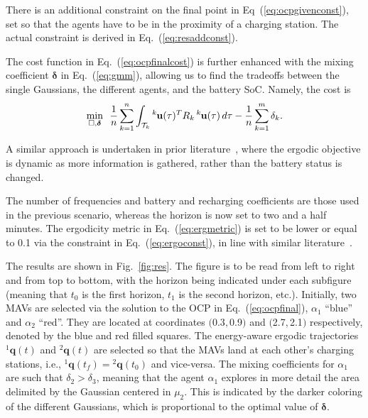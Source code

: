 \documentclass[letterpaper,10pt,conference,twoside]{IEEEtran}
\theoremstyle{definition}
\begin{document}
There is an additional constraint on the final point in Eq~(\ref{eq:ocpgivenconst}), set so that the agents have to be in the proximity of a charging station. The actual constraint is derived in Eq.~(\ref{eq:resaddconst}). %

The cost function in Eq.~(\ref{eq:ocpfinalcost}) is further enhanced with the mixing coefficient $\boldsymbol{\delta}$ in Eq.~(\ref{eq:gmm}), allowing us to find the tradeoffs between the single Gaussians, the different agents, and the battery SoC. Namely, the cost is
\begin{equation}
  \min_{\square,\boldsymbol{\delta}}\,\,\,{\frac{1}{n}\sum_{k=1}^{n}\int_{\mathcal{T}_k}{}^k\hspace*{-.1ex}\mathbf{u}(\tau)^TR_k\,{}^k\hspace*{-.1ex}\mathbf{u}(\tau)\,d\tau-\frac{1}{n}\sum_{k=1}^{m}\delta_k}.
\end{equation}

A similar approach is undertaken in prior literature~\cite{rao2023multi}, where the ergodic objective is dynamic as more information is gathered, rather than the battery status is changed.

The number of frequencies and battery and recharging coefficients are those used in the previous scenario, whereas the horizon is now set to two and a half minutes.
The ergodicity metric in Eq.~(\ref{eq:ergmetric}) is set to be lower or equal to 0.1 via the constraint in Eq.~(\ref{eq:ergoconst}), in line with similar literature~\cite{dong2023time}.

The results are shown in Fig.~\ref{fig:res}. The figure is to be read from left to right and from top to bottom, with the horizon being indicated under each subfigure (meaning that $t_0$ is the first horizon, $t_1$ is the second horizon, etc.). Initially, two MAVs are selected via the solution to the OCP in Eq.~(\ref{eq:ocpfinal}), $\alpha_1$ ``blue'' and $\alpha_2$ ``red''. They are located at coordinates $($0.3$,$0.9$)$ and $($2.7$,$2.1$)$ respectively, denoted by the blue and red filled squares. The energy-aware ergodic trajectories ${}^1\mathbf{q}(t)$ and ${}^2\mathbf{q}(t)$ are selected so that the MAVs land at each other's charging stations, i.e., ${}^1\mathbf{q}(t_f)={}^2\mathbf{q}(t_0)$ and vice-versa. The mixing coefficients for $\alpha_1$ are such that $\delta_2>\delta_3$, meaning that the agent $\alpha_1$ explores in more detail the area delimited by the Gaussian centered in $\mu_2$. This is indicated by the darker coloring of the different Gaussians, which is proportional to the optimal value of $\boldsymbol{\delta}$. 
\end{document}
